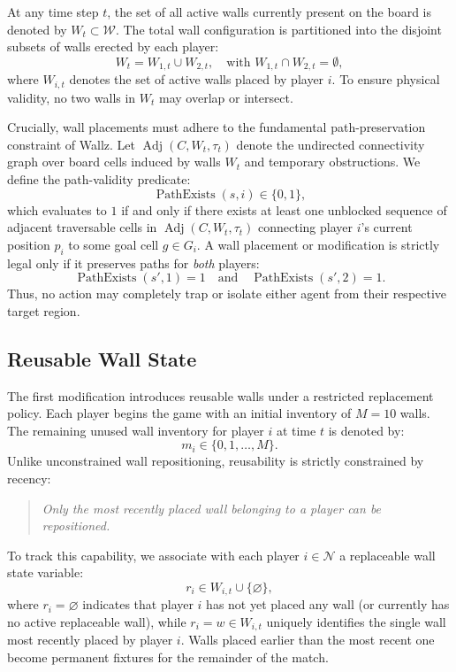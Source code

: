 \documentclass{article}
\begin{document}
At any time step $t$, the set of all active walls currently present on the board is denoted by $W_t \subset \mathcal{W}$. The total wall configuration is partitioned into the disjoint subsets of walls erected by each player:
\begin{equation}
W_t = W_{1,t} \cup W_{2,t}, \quad \text{with } W_{1,t} \cap W_{2,t} = \emptyset,
\end{equation}
where $W_{i,t}$ denotes the set of active walls placed by player $i$. To ensure physical validity, no two walls in $W_t$ may overlap or intersect.

Crucially, wall placements must adhere to the fundamental path-preservation constraint of Wallz. Let $\operatorname{Adj}(C, W_t, \tau_t)$ denote the undirected connectivity graph over board cells induced by walls $W_t$ and temporary obstructions. We define the path-validity predicate:
\begin{equation}
\operatorname{PathExists}(s, i) \in \{0, 1\},
\end{equation}
which evaluates to $1$ if and only if there exists at least one unblocked sequence of adjacent traversable cells in $\operatorname{Adj}(C, W_t, \tau_t)$ connecting player $i$'s current position $p_i$ to some goal cell $g \in G_i$. A wall placement or modification is strictly legal only if it preserves paths for \emph{both} players:
\begin{equation}
\operatorname{PathExists}(s', 1) = 1 \quad \text{and} \quad \operatorname{PathExists}(s', 2) = 1.
\end{equation}
Thus, no action may completely trap or isolate either agent from their respective target region.

\subsection{Reusable Wall State}
\label{subsec:reusable_wall_state}

The first modification introduces reusable walls under a restricted replacement policy. Each player begins the game with an initial inventory of $M = 10$ walls. The remaining unused wall inventory for player $i$ at time $t$ is denoted by:
\begin{equation}
m_i \in \{0, 1, \dots, M\}.
\end{equation}
Unlike unconstrained wall repositioning, reusability is strictly constrained by recency:
\begin{quote}
\emph{Only the most recently placed wall belonging to a player can be repositioned.}
\end{quote}
To track this capability, we associate with each player $i \in \mathcal{N}$ a replaceable wall state variable:
\begin{equation}
r_i \in W_{i,t} \cup \{\varnothing\},
\end{equation}
where $r_i = \varnothing$ indicates that player $i$ has not yet placed any wall (or currently has no active replaceable wall), while $r_i = w \in W_{i,t}$ uniquely identifies the single wall most recently placed by player $i$. Walls placed earlier than the most recent one become permanent fixtures for the remainder of the match.
\end{document}
